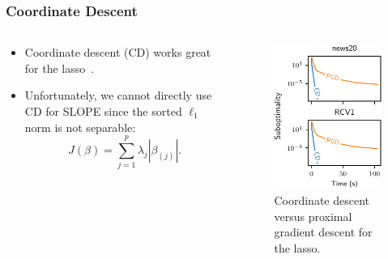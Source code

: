 \begin{frame}
  \frametitle{Coordinate Descent}

  \begin{columns}[c]
    \begin{column}{0.45\textwidth}

      \begin{itemize}
        \item<1-> Coordinate descent (CD) works great for the lasso~\parencite{friedman2010}.
        \item<2->
        Unfortunately, we cannot directly use CD for SLOPE since the
        sorted \(\ell_1\) norm is \alert{not separable}:
        \[
          J(\beta) = \sum_{j=1}^p \lambda_j |\beta_{(j)}|.
        \]
      \end{itemize}

      \medskip

    \end{column}
    \begin{column}{0.45\textwidth}
      \begin{figure}[htpb]
        \centering
        \includegraphics[]{figures/cd-vs-pgd.pdf}
        \caption{%
          Coordinate descent versus proximal gradient descent for the lasso.
        }
        \label{fig:cd-vs-pgd}
      \end{figure}
    \end{column}
  \end{columns}

\end{frame}

